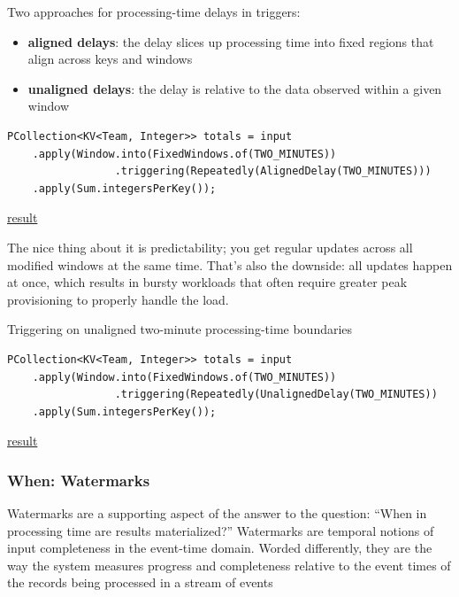 \documentclass[11pt]{article}
\begin{document}
Two approaches for processing-time delays in triggers:
\begin{itemize}
\item \textbf{aligned delays}: the delay slices up processing time into fixed regions that align across keys
and windows
\item \textbf{unaligned delays}: the delay is relative to the data observed within a given window
\end{itemize}
\begin{verbatim}
PCollection<KV<Team, Integer>> totals = input
    .apply(Window.into(FixedWindows.of(TWO_MINUTES))
                 .triggering(Repeatedly(AlignedDelay(TWO_MINUTES)))
    .apply(Sum.integersPerKey());
\end{verbatim}
\href{http://www.streamingbook.net/fig/2-7}{result}

The nice thing about it is predictability; you get regular updates across all modified windows
at the same time. That’s also the downside: all updates happen at once, which results in bursty
workloads that often require greater peak provisioning to properly handle the load.

\begin{listing}[H]
\caption{Triggering on unaligned two-minute processing-time boundaries}
\label{}
\begin{verbatim}
PCollection<KV<Team, Integer>> totals = input
    .apply(Window.into(FixedWindows.of(TWO_MINUTES))
                 .triggering(Repeatedly(UnalignedDelay(TWO_MINUTES))
    .apply(Sum.integersPerKey());
\end{verbatim}
\end{listing}


\href{http://www.streamingbook.net/fig/2-8}{result}
\subsubsection{When: Watermarks}
\label{sec:org379ffeb}
Watermarks are a supporting aspect of the answer to the question: “When in processing time are
results materialized?” Watermarks are temporal notions of input completeness in the event-time
domain. Worded differently, they are the way the system measures progress and completeness
relative to the event times of the records being processed in a stream of events
\end{document}
